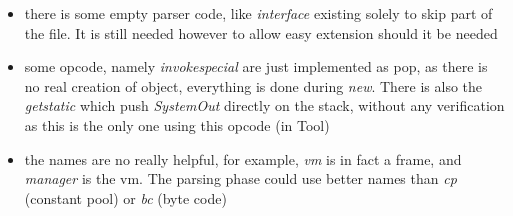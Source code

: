 \begin{itemize}
	\item there is some empty parser code, like \emph{interface} existing
		solely to skip part of the file. It is still needed however to
		allow easy extension should it be needed

	\item some opcode, namely \emph{invokespecial} are just implemented as
		pop, as there is no real creation of object, everything is done
		during \emph{new}. There is also the \emph{getstatic} which push
		\emph{SystemOut} directly on the stack, without any verification
		as this is the only one using this opcode (in Tool)

	\item the names are no really helpful, for example, \emph{vm} is in fact
		a frame, and \emph{manager} is the vm. The parsing phase could
		use better names than \emph{cp} (constant pool) or \emph{bc}
		(byte code)
\end{itemize}
